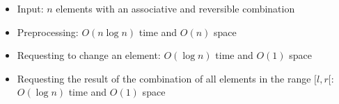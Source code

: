 \begin{itemize}
	\item Input: $n$ elements with an associative and reversible combination
	\item Preprocessing: $O(n\log{n})$ time and $O(n)$ space
	\item Requesting to change an element: $O(\log{n})$ time and $O(1)$ space
	\item Requesting the result of the combination of all elements in the range $[l,r[$: $O(\log{n})$ time and $O(1)$ space
\end{itemize}
